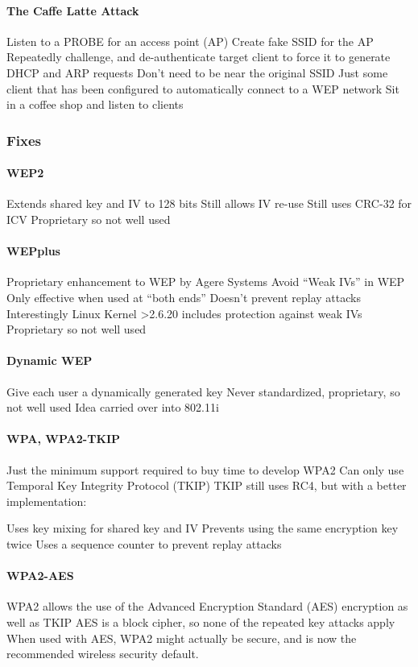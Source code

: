 \documentclass[pdftex, 12pt, a4paper]{article}
\begin{document}
\paragraph{The Caffe Latte Attack}
Listen to a PROBE for an access point (AP)
Create fake SSID for the AP
Repeatedly challenge, and de-authenticate target client to force it to generate DHCP and ARP requests
Don't need to be near the original SSID
Just some client that has been configured to automatically connect to a WEP network
Sit in a coffee shop and listen to clients

\subsubsection{Fixes}

\paragraph{WEP2}
Extends shared key and IV to 128 bits
Still allows IV re-use
Still uses CRC-32 for ICV
Proprietary so not well used
\paragraph{WEPplus}
Proprietary enhancement to WEP by Agere Systems
Avoid ``Weak IVs'' in WEP
Only effective when used at ``both ends''
Doesn't prevent replay attacks
Interestingly Linux Kernel \textgreater 2.6.20 includes protection against weak IVs
Proprietary so not well used
\paragraph{Dynamic WEP}
Give each user a dynamically generated key
Never standardized, proprietary, so not well used
Idea carried over into 802.11i

\paragraph{WPA, WPA2-TKIP}
Just the minimum support required to buy time to develop WPA2
Can only use Temporal Key Integrity Protocol (TKIP)
TKIP still uses RC4, but with a better implementation:

Uses key mixing for shared key and IV
Prevents using the same encryption key twice
Uses a sequence counter to prevent replay attacks

\paragraph{WPA2-AES}
WPA2 allows the use of the Advanced Encryption Standard (AES) encryption as well as TKIP
AES is a block cipher, so none of the repeated key attacks apply
When used with AES, WPA2 might actually be secure, and is now the recommended wireless security default.
\end{document}
